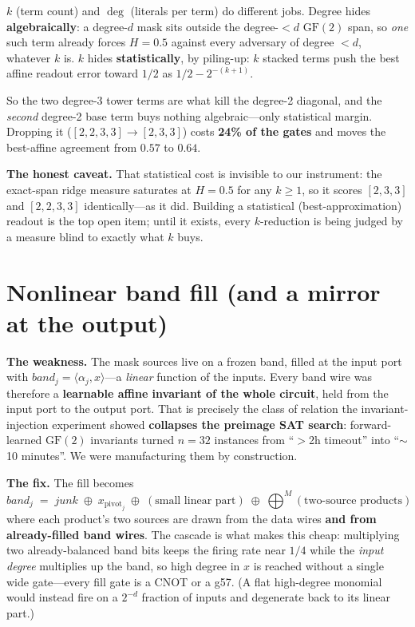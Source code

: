 \documentclass[11pt]{article}
\newcommand{\xor}{\oplus}
\begin{document}
$k$ (term count) and $\deg$ (literals per term) do different jobs. Degree hides
\textbf{algebraically}: a degree-$d$ mask sits outside the degree-$<d$
$\mathrm{GF}(2)$ span, so \emph{one} such term already forces $H=0.5$ against
every adversary of degree $<d$, whatever $k$ is. $k$ hides
\textbf{statistically}, by piling-up: $k$ stacked terms push the best affine
readout error toward $1/2$ as $1/2-2^{-(k+1)}$.

So the two degree-3 tower terms are what kill the degree-2 diagonal, and the
\emph{second} degree-2 base term buys nothing algebraic---only statistical
margin. Dropping it ($[2,2,3,3]\to[2,3,3]$) costs \textbf{24\% of the gates} and
moves the best-affine agreement from $0.57$ to $0.64$.

\textbf{The honest caveat.} That statistical cost is invisible to our
instrument: the exact-span ridge measure saturates at $H=0.5$ for any $k\ge1$,
so it scores $[2,3,3]$ and $[2,2,3,3]$ identically---as it did. Building a
statistical (best-approximation) readout is the top open item; until it exists,
every $k$-reduction is being judged by a measure blind to exactly what $k$ buys.

\section{Nonlinear band fill (and a mirror at the output)}

\textbf{The weakness.} The mask sources live on a frozen band, filled at the
input port with $\mathit{band}_j=\langle\alpha_j,x\rangle$---a \emph{linear}
function of the inputs. Every band wire was therefore a \textbf{learnable affine
invariant of the whole circuit}, held from the input port to the output port.
That is precisely the class of relation the invariant-injection experiment
showed \textbf{collapses the preimage SAT search}: forward-learned
$\mathrm{GF}(2)$ invariants turned $n{=}32$ instances from ``$>$2h timeout''
into ``$\sim$10 minutes''. We were manufacturing them by construction.

\textbf{The fix.} The fill becomes
\[
\mathit{band}_j \;=\; \mathit{junk}\;\xor\;x_{\mathrm{pivot}_j}\;\xor\;(\text{small linear part})\;\xor\;\bigoplus\nolimits^{M}(\text{two-source products})
\]
where each product's two sources are drawn from the data wires \textbf{and from
already-filled band wires}. The cascade is what makes this cheap: multiplying
two already-balanced band bits keeps the firing rate near $1/4$ while the
\emph{input degree} multiplies up the band, so high degree in $x$ is reached
without a single wide gate---every fill gate is a CNOT or a g57. (A flat
high-degree monomial would instead fire on a $2^{-d}$ fraction of inputs and
degenerate back to its linear part.)
\end{document}
